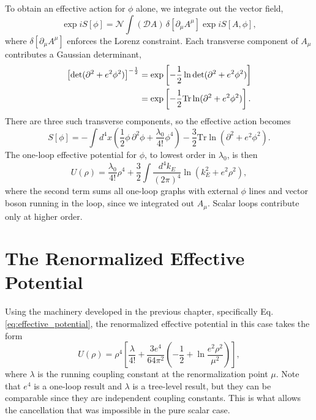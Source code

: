 To obtain an effective action for $\phi$ alone, we integrate out the
vector field,
\begin{equation}
	\exp iS[\phi] = \mathcal{N}\int(\mathcal{D}A)\,
	\delta[\partial_\mu A^\mu]\exp iS[A,\phi],
\end{equation}
where $\delta[\partial_\mu A^\mu]$ enforces the Lorenz constraint. Each
transverse component of $A_\mu$ contributes a Gaussian determinant,
\begin{align}
	\left[\det(\partial^2 + e^2\phi^2)\right]^{-\frac{1}{2}}
	 & = \exp\left[-\frac{1}{2}\ln\det(\partial^2 + e^2\phi^2)\right]
	\notag                                                            \\
	 & = \exp\left[-\frac{1}{2}\mathrm{Tr}\ln(\partial^2
		         + e^2\phi^2)\right].
\end{align}
There are three such transverse components, so the effective action
becomes
\begin{equation}
	S[\phi] = -\int d^4x\left(\frac{1}{2}\phi\,\partial^2\phi
	+ \frac{\lambda_0}{4!}\phi^4\right)
	- \frac{3}{2}\mathrm{Tr}\ln(\partial^2 + e^2\phi^2).
\end{equation}
The one-loop effective potential for $\phi$, to lowest order in
$\lambda_0$, is then
\begin{equation}
	U(\rho) = \frac{\lambda_0}{4!}\rho^4
	+ \frac{3}{2}\int\frac{d^4k_E}{(2\pi)^4}
	\ln(k_E^2 + e^2\rho^2),
\end{equation}
where the second term sums all one-loop graphs with external $\phi$ lines
and vector boson running in the loop, since we integrated out $A_\mu$.
Scalar loops contribute only at higher order.

\section{The Renormalized Effective Potential}

Using the machinery developed in the previous chapter, specifically
Eq.\eqref{eq:effective_potential}, the renormalized effective potential
in this case takes the form
\begin{equation}
	U(\rho) = \rho^4\left[\frac{\lambda}{4!}
		+ \frac{3e^4}{64\pi^2}\left(-\frac{1}{2}
		+ \ln\frac{e^2\rho^2}{\mu^2}\right)\right],
	\label{eq:renormalized_eff_potential}
\end{equation}
where $\lambda$ is the running coupling constant at the renormalization
point $\mu$. Note that $e^4$ is a one-loop result and $\lambda$ is a
tree-level result, but they can be comparable since they are independent
coupling constants. This is what allows the cancellation that was
impossible in the pure scalar case.

